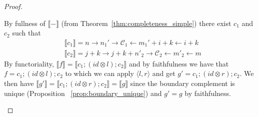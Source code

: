 \begin{proof}
\begin{itemize}
		By fullness of $\llbracket - \rrbracket$ (from Theorem~\ref{thm:completeness_simple}) there exist $c_{1}$ and $c_{2}$ such that 
		\begin{align*}
		&\llbracket c_{1} \rrbracket = n \xrightarrow{} n_{1}' \xrightarrow{} \mathcal{C}_{1} \xleftarrow{} m_{1}' + i + k \xleftarrow{} i + k\\
        &\llbracket c_{2} \rrbracket = j + k \xrightarrow{} j + k + n'_{2} \xrightarrow{} \mathcal{C}_{2} \xleftarrow{} m'_{2} \xleftarrow{} m
        \end{align*}
		By functoriality, $\llbracket f \rrbracket = \llbracket c_{1};(id \otimes l);c_{2} \rrbracket$ and by faithfulness we have that $f = c_{1};(id \otimes l);c_{2}$ to which we can apply $\langle l, r \rangle$ and get $g' = c_{1};(id \otimes r);c_{2}$.
		We then have $\llbracket g' \rrbracket = \llbracket c_{1};(id \otimes r);c_{2} \rrbracket =  \llbracket g \rrbracket$ since the boundary complement is unique (Proposition ~\ref{prop:boundary_unique}) and $g' = g$ by faithfulness.


\end{itemize}
\end{proof}
